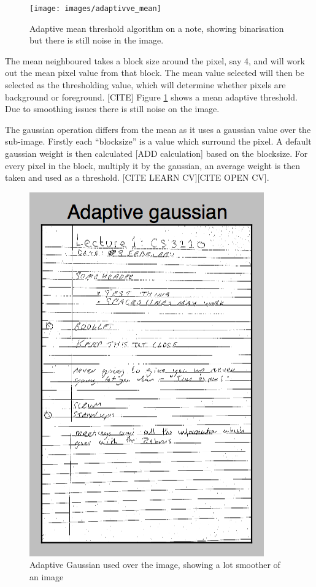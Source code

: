 \begin{figure}[H]
  \centering
  \texttt{[image: images/adaptivve\_mean]}
  \caption{Adaptive mean threshold algorithm on a note, showing binarisation but there is still noise in the image.}
  \label{fig:adaptive_mean}
\end{figure}

The mean neighboured takes a block size around the pixel, say 4, and will work out the mean pixel value from that block. The mean value selected will then be selected as the thresholding value, which will determine whether pixels are background or foreground. [CITE] Figure \ref{fig:adaptive_mean} shows a mean adaptive threshold. Due to smoothing issues there is still noise on the image.

The gaussian operation differs from the mean as it uses a gaussian value over the sub-image. Firstly each ``blocksize'' is a value which surround the pixel. A default gaussian weight is then calculated [ADD calculation] based on the blocksize. For every pixel in the block, multiply it by the gaussian, an average weight is then taken and used as a threshold. [CITE LEARN CV][CITE OPEN CV].


\begin{figure}[H]
  \centering
  \includegraphics{images/adaptive_gaussian}
  \caption{Adaptive Gaussian used over the image, showing a lot smoother of an image}
  \label{fig:adaptive_gaussian}
\end{figure}

